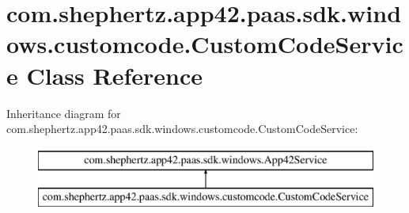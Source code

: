 \hypertarget{classcom_1_1shephertz_1_1app42_1_1paas_1_1sdk_1_1windows_1_1customcode_1_1_custom_code_service}{\section{com.\+shephertz.\+app42.\+paas.\+sdk.\+windows.\+customcode.\+Custom\+Code\+Service Class Reference}
\label{classcom_1_1shephertz_1_1app42_1_1paas_1_1sdk_1_1windows_1_1customcode_1_1_custom_code_service}
}
Inheritance diagram for com.\+shephertz.\+app42.\+paas.\+sdk.\+windows.\+customcode.\+Custom\+Code\+Service\+:\begin{figure}[H]
\begin{center}
\leavevmode
\includegraphics[height=2.000000cm]{classcom_1_1shephertz_1_1app42_1_1paas_1_1sdk_1_1windows_1_1customcode_1_1_custom_code_service}
\end{center}
\end{figure}
